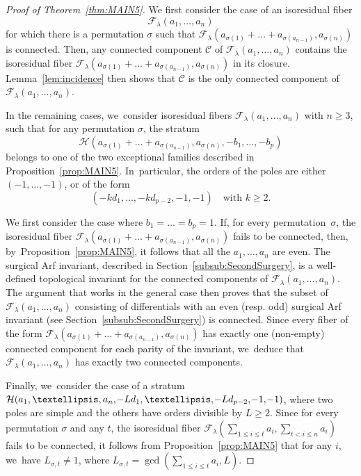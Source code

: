 \documentclass[11pt]{article}
\newcommand{\resp}{resp.\xspace}
\theoremstyle{definition}
\begin{document}
\begin{proof}[Proof of Theorem~\ref{thm:MAIN5}]
We first consider the case of an isoresidual fiber\vspace*{-3pt}
\[
\mathcal{F}_{\lambda}(a_{1},\dots,a_{n})
\]
for which there is a permutation $\sigma$ such that $\mathcal{F}_{\lambda}(a_{\sigma(1)}+\dots+a_{\sigma(a_{n-1})},a_{\sigma(n)})$ is connected. Then, any connected component $\mathcal{C}$ of $\mathcal{F}_{\lambda}(a_{1},\dots,a_{n})$ contains the isoresidual fiber $\mathcal{F}_{\lambda}(a_{\sigma(1)}+\dots+a_{\sigma(a_{n-1})},a_{\sigma(n)})$ in its closure. Lemma~\ref{lem:incidence} then shows that $\mathcal{C}$ is the only connected component of $\mathcal{F}_{\lambda}(a_{1},\dots,a_{n})$.

In the remaining cases, we~consider isoresidual fibers $\mathcal{F}_{\lambda}(a_{1},\dots,a_{n})$ with $n \geq 3$, such that for any permutation $\sigma$, the stratum\vspace*{-3pt}
\[
\mathcal{H}(a_{\sigma(1)}+\dots+a_{\sigma(a_{n-1})},a_{\sigma(n)},-b_{1},\dots,-b_{p})
\]
belongs to one of the two exceptional families described in
Proposition~\ref{prop:MAIN5}. In~particular, the orders of the poles are either $(-1,\dots,-1)$, or of the form
\[
(-kd_{1},\dots,-kd_{p-2},-1,-1)\quad\text{with }k \geq 2.
\]

We first consider the case where $b_{1}=\dots=b_{p}=1$. If, for every permutation~$\sigma$, the isoresidual fiber $\mathcal{F}_{\lambda}(a_{\sigma(1)}+\dots+a_{\sigma(a_{n-1})},a_{\sigma(n)})$ fails to be connected, then, by~Proposition~\ref{prop:MAIN5}, it follows that all the $a_{1},\dots,a_{n}$ are even. The surgical Arf invariant, described in Section~\ref{subsub:SecondSurgery}, is a well-defined topological invariant for the connected components of $\mathcal{F}_{\lambda}(a_{1},\dots,a_{n})$. The argument that works in the general case then proves that the subset of $\mathcal{F}_{\lambda}(a_{1},\dots,a_{n})$ consisting of differentials with an even (\resp odd) surgical Arf invariant (see Section~\ref{subsub:SecondSurgery}) is connected. Since every fiber of the form $\mathcal{F}_{\lambda}(a_{\sigma(1)}+\dots+a_{\sigma(a_{n-1})},a_{\sigma(n)})$ has exactly one (non-empty) connected component for each parity of the invariant, we~deduce that $\mathcal{F}_{\lambda}(a_{1},\dots,a_{n})$ has exactly two connected components.

Finally, we~consider the case of a stratum $\mathcal{H}(a_{1},\dots,a_{n},\mkern-2mu -Ld_{1},\dots,\mkern-2mu -Ld_{p-2},\mkern-2mu -1,\mkern-2mu -1)$, where two poles are simple and the others have orders divisible by $L \geq 2$. Since for every permutation $\sigma$ and any $t$, the isoresidual fiber $\mathcal{F}_{\lambda}(\sum_{1 \leq i \leq t} a_{i}, \sum_{t< i\leq n} a_{i})$ fails to be connected, it follows from Proposition~\ref{prop:MAIN5} that for any $i$, we~have $L_{\sigma,t} \neq 1$, where $L_{\sigma,t} = \gcd(\sum_{1 \leq i \leq t} a_{i},L)$.


\end{proof}
\end{document}
